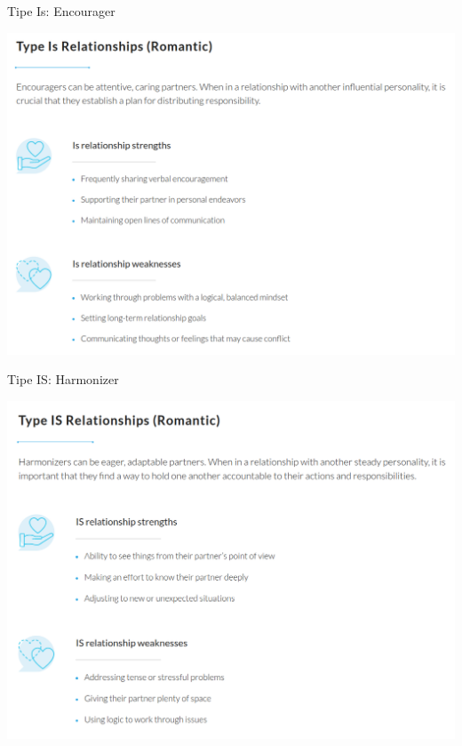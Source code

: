 \documentclass{beamer}
\theoremstyle{mystyle}
\begin{document}
\begin{frame}{Tipe Is: Encourager}
	\begin{center}
		\includegraphics[scale=.275]{images/Is}
	\end{center}
\end{frame}

\begin{frame}{Tipe IS: Harmonizer}
	\begin{center}
		\includegraphics[scale=.275]{images/IS}
	\end{center}
\end{frame}
\end{document}
